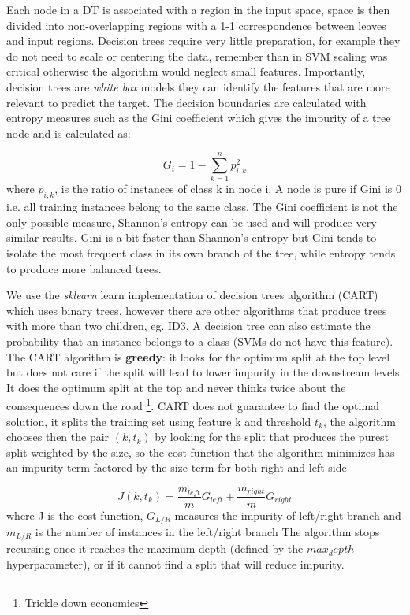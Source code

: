 \documentclass[11pt]{article}
\theoremstyle{definition}
\theoremstyle{remark}
\begin{document}
Each node in a DT is associated with a region in the input space, space is then divided into non-overlapping regions with a 1-1 correspondence between leaves and input regions. Decision trees require very little preparation, for example they do not need to scale or centering the data, remember than in SVM scaling was critical otherwise the algorithm would neglect small features.
Importantly, decision trees are \emph{white box} models they can identify the features that are more relevant to predict the target.
The decision boundaries are calculated with entropy measures such as the Gini coefficient which gives the impurity of a tree node and is calculated as:

\begin{equation} 
G_i = 1- \sum_{k=1}^{n} p_{i,k}^2
\label{eq:gini}
\end{equation}
where $p_{i,k}$, is the ratio of instances of class k in node i. A node is pure if Gini is 0 i.e. all training instances belong to the same class. The Gini coefficient is not the only possible measure, Shannon's entropy can be used and will produce very similar results. Gini is a bit faster than Shannon's entropy but Gini tends to isolate the most frequent class in its own branch of the tree, while entropy tends to produce more balanced trees. %

We use the \emph{sklearn} learn implementation of decision trees algorithm (CART) which uses binary trees, however there are other algorithms that produce trees with more than two children, eg. ID3. A decision tree can also estimate the probability that an instance belongs to a class (SVMs do not have this feature).
The CART algorithm is \textbf{greedy}: it looks for the optimum split at the top level but does not care if the split will lead to lower impurity in the downstream levels. It does the optimum split at the top and never thinks twice about the consequences down the road \footnote{Trickle down economics}. CART does not guarantee to find the optimal solution, it splits the training set using feature k and threshold $t_k$, the algorithm chooses then the pair $(k,t_k)$ by looking for the split that produces the purest split weighted by the size, so the cost function that the algorithm minimizes has an impurity term factored by the size term for both right and left side 

\begin{equation}\label{eq:cart}
J(k,t_k) = \frac{m_{left}}{m}G_{left} + \frac{m_{right}}{m}G_{right}
\end{equation}
where J is the cost function, $G_{L/R}$ measures the impurity of left/right branch and $m_{L/R}$ is the number of instances in the left/right branch 
The algorithm stops recursing once it reaches the maximum depth (defined by the $max_depth$ hyperparameter), or if it cannot find a split that will reduce impurity. 
\end{document}
